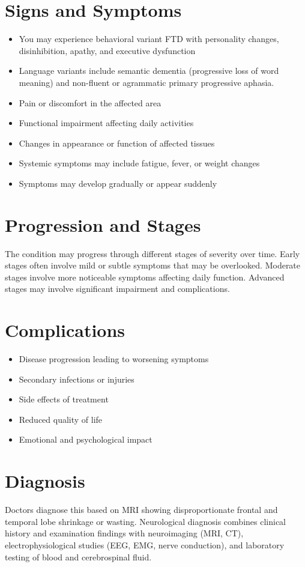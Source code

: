 \section{Signs and Symptoms}
\begin{itemize}[noitemsep]
  \item You may experience behavioral variant FTD with personality changes, disinhibition, apathy, and executive dysfunction
  \item Language variants include semantic dementia (progressive loss of word meaning) and non-fluent or agrammatic primary progressive aphasia.
  \item Pain or discomfort in the affected area
  \item Functional impairment affecting daily activities
  \item Changes in appearance or function of affected tissues
  \item Systemic symptoms may include fatigue, fever, or weight changes
  \item Symptoms may develop gradually or appear suddenly
\end{itemize}
\section{Progression and Stages}
The condition may progress through different stages of severity over time. Early stages often involve mild or subtle symptoms that may be overlooked. Moderate stages involve more noticeable symptoms affecting daily function. Advanced stages may involve significant impairment and complications.
\section{Complications}
\begin{itemize}[noitemsep]
  \item Disease progression leading to worsening symptoms
  \item Secondary infections or injuries
  \item Side effects of treatment
  \item Reduced quality of life
  \item Emotional and psychological impact
\end{itemize}
\section{Diagnosis}
Doctors diagnose this based on MRI showing disproportionate frontal and temporal lobe shrinkage or wasting. Neurological diagnosis combines clinical history and examination findings with neuroimaging (MRI, CT), electrophysiological studies (EEG, EMG, nerve conduction), and laboratory testing of blood and cerebrospinal fluid.

